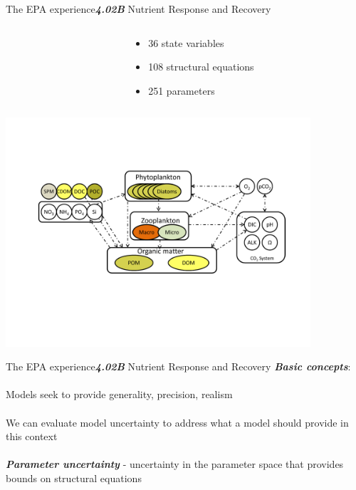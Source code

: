 \documentclass[serif]{beamer}\usepackage[]{graphicx}\usepackage[]{color}
\newcommand{\emtxt}[1]{\textbf{\textit{#1}}}
\begin{document}
\begin{frame}{The EPA experience}{\emtxt{4.02B} Nutrient Response and Recovery}
\begin{columns}
\begin{column}{0.5\textwidth}
\centerline{}
\end{column}
\begin{column}{0.5\textwidth}
\begin{itemize}
\item 36 state variables
\item 108 structural equations
\item 251 parameters
\end{itemize}
\end{column}
\end{columns}
\vspace{0.1in}
\centerline{\includegraphics[width=0.85\textwidth]{fig/fishmod.pdf}}
\end{frame}

\begin{frame}{The EPA experience}{\emtxt{4.02B} Nutrient Response and Recovery}
\emtxt{Basic concepts}: \\~\\
Models seek to provide generality, precision, realism \cite{Levins66}\\~\\
We can evaluate model uncertainty to address what a model should provide in this context\\~\\
\emtxt{Parameter uncertainty} - uncertainty in the parameter space that provides bounds on structural equations
\end{frame}
\end{document}
